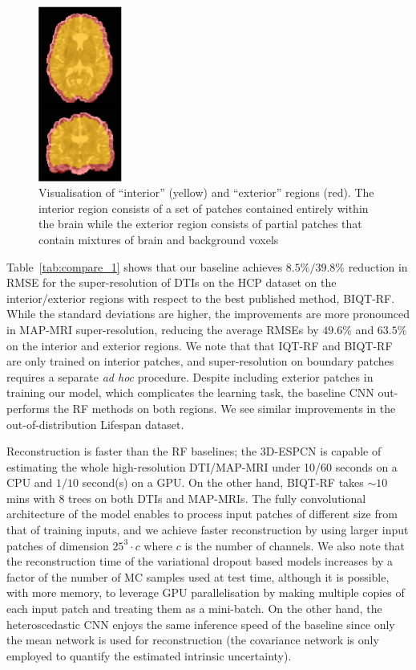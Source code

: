 \begin{figure}[t]
	\centering
	\includegraphics[width=2.75cm]{chapter_3/figures/fig_3_2.png}
	\small
	\caption{Visualisation of ``interior'' (yellow) and ``exterior'' regions (red). The interior region consists of a set of patches contained entirely within the brain while the exterior region consists of partial patches that contain mixtures of brain and background voxels} 
	\label{fig:mask}
\end{figure}

Table~\ref{tab:compare_1} shows that our baseline achieves $8.5\%/39.8\%$ reduction in RMSE for the super-resolution of DTIs on the HCP dataset on the interior/exterior regions with respect to the best published method, BIQT-RF\cite{tanno2016bayesian}. While the standard deviations are higher, the improvements are more pronounced in MAP-MRI super-resolution, reducing the average RMSEs by $49.6\%$ and $63.5\%$ on the interior and exterior regions. We note that that IQT-RF and BIQT-RF are only trained on interior patches, and super-resolution on boundary patches requires a separate \textit{ad hoc} procedure. Despite including exterior patches in training our model, which complicates the learning task, the baseline CNN out-performs the RF methods on both regions. We see similar improvements in the out-of-distribution Lifespan dataset.

Reconstruction is faster than the RF baselines; the 3D-ESPCN is capable of estimating the whole high-resolution DTI/MAP-MRI under 10/60 seconds on a CPU and $1/10$ second(s) on a GPU. On the other hand, BIQT-RF takes $\sim10$ mins with 8 trees on both DTIs and MAP-MRIs. The fully convolutional architecture of the model enables to process input patches of different size from that of training inputs, and we achieve faster reconstruction by using larger input patches of dimension $25^3\cdot c$ where $c$ is the number of channels. We also note that the reconstruction time of the variational dropout based models increases by a factor of the number of MC samples used at test time, although it is possible, with more memory, to leverage GPU parallelisation by making multiple copies of each input patch and treating them as a mini-batch. On the other hand, the heteroscedastic CNN enjoys the same inference speed of the baseline since only the mean network is used for reconstruction (the covariance network is only employed to quantify the estimated intrinsic uncertainty). 

